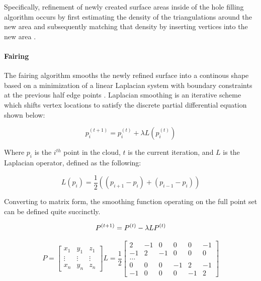\documentclass[12pt]{drexelthesis}
\begin{document}
Specifically, refinement of newly created surface areas inside of the hole filling algorithm occurs by first estimating the density of the triangulations around the new area and subsequently matching that density by inserting vertices into the new area \cite{meshrefinement}.

\paragraph{Fairing}
The fairing algorithm smooths the newly refined surface into a continous shape based on a minimization of a linear Laplacian system with boundary constraints at the previous half edge points \cite{meshfairing}. Laplacian smoothing is an iterative scheme which shifts vertex locations to satisfy the discrete partial differential equation shown below:

\begin{equation}
	p_{i}^{(t+1)} = p_{i}^{(t)} + \lambda L(p_{i}^{(t)})
\end{equation}

Where $p_{i}$ is the $i^{th}$ point in the cloud, $t$ is the current iteration, and $L$ is the Laplacian operator, defined as the following:

\begin{equation}
	L(p_{i}) = \frac{1}{2} ( (p_{i+1} - p_{i}) + (p_{i-1} - p_{i}) )
\end{equation}

Converting to matrix form, the smoothing function operating on the full point set can be defined quite succinctly.

\begin{equation}
	P^{(t+1)} = P^{(t)} - \lambda L P^{(t)} \\
\end{equation}

\begin{equation}
	P =  \begin{bmatrix}
		x_{1} & y_{1} & z_{1} \\
		\vdots & \vdots & \vdots \\
		x_{n} & y_{n} & z_{n}
		\end{bmatrix}    
		L = \frac{1}{2} \begin{bmatrix}
			2 	& -1 	& 0 	& 0 	& 0 	& -1 	\\
			-1 	&  2 	& -1 	& 0 	& 0 	& 0  	\\
							\hdots						\\
			0	& 0		&	0	& -1	& 2		& -1	\\
			-1	& 0 	& 0 	& 0 	& -1	& 2
			\end{bmatrix}
\end{equation}
\end{document}
